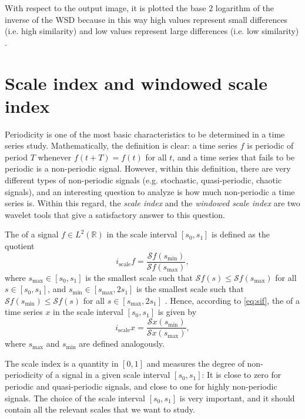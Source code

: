 With respect to the output image, it is plotted the base $2$ logarithm of the inverse of the WSD because in this way high values represent small differences (i.e. high similarity) and low values represent large differences (i.e. low similarity) \citep{bol17}.

\section{Scale index and windowed scale index}
\label{sec5}

Periodicity is one of the most basic characteristics to be determined in a time series study. Mathematically, the definition is clear: a time series $f$ is periodic of period $T$ whenever $f(t+T) = f(t)$ for all $t$, and a time series that fails to be periodic is a non-periodic signal. However, within this definition, there are very different types of non-periodic signals (e.g. stochastic, quasi-periodic, chaotic signals), and an interesting question to analyze is how much non-periodic a time series is. Within this regard, the \emph{scale index} and the \emph{windowed scale index} \citep{ben10,bol20} are two wavelet tools that give a satisfactory answer to this question.

The  of a signal $f\in L^2\left( \mathbb{R}\right) $ in the scale interval $\left[ s_0,s_1\right] $ is defined as the quotient
\begin{equation}
\label{eq:sif}
i_{\textrm{scale}}f=\frac{\mathcal{S}f(s_{\textrm{min}})}{\mathcal{S}f(s_{\textrm{max}})},
\end{equation}
where $s_{\textrm{max}}\in \left[ s_0,s_1\right] $ is the smallest scale such that $\mathcal{S}f(s)\leq \mathcal{S}f(s_{\textrm{max}})$ for all $s\in \left[ s_0,s_1\right] $, and $s_{\textrm{min}}\in \left[ s_{\textrm{max}},2s_1\right] $ is the smallest scale such that $\mathcal{S}f(s_{\textrm{min}})\leq \mathcal{S}f(s)$ for all $s\in \left[ s _{\textrm{max}}, 2s_1 \right] $ \citep{ben10,bol20}. Hence, according to \eqref{eq:sif}, the  of a time series $x$ in the scale interval $\left[ s_0,s_1\right] $ is given by
\begin{equation}
\label{eq:six}
i_{\textrm{scale}}x=\frac{\mathcal{S}x(s_{\textrm{min}})}{\mathcal{S}x(s_{\textrm{max}})},
\end{equation}
where $s_{\textrm{max}}$ and $s_{\textrm{min}}$ are defined analogously.

The scale index is a quantity in $[0,1]$ and measures the degree of non-periodicity of a signal in a given scale interval $\left[ s_0,s_1\right] $: It is close to zero for periodic and quasi-periodic signals, and close to one for highly non-periodic signals. The choice of the scale interval $\left[ s_0,s_1\right] $ is very important, and it should contain all the relevant scales that we want to study.

